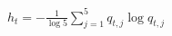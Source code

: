\documentclass[border=3pt,varwidth=16cm]{standalone}
\begin{document}
$\displaystyle h_t = -\frac{1}{\log 5}\sum_{j=1}^{5} q_{t,j}\log q_{t,j}$
\end{document}
